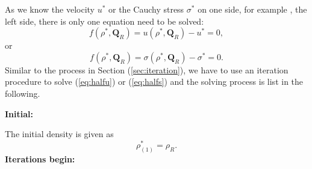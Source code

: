 \documentclass[review]{elsarticle}
\numberwithin{equation}{section}
\numberwithin{table}{section}
\begin{document}
As we know the velocity $u^*$ or the Cauchy stress $\sigma ^*$ on one side, for example , the left side, there is only one equation need to be solved:
\begin{equation}\label{eq:halfu}
  f(\rho^*,\mathbf{Q}_R) =u(\rho^*,\mathbf{Q}_R) - u^* = 0,
\end{equation}
or
\begin{equation}\label{eq:halfs}
  f(\rho^*,\mathbf{Q}_R) =\sigma(\rho^*,\mathbf{Q}_R) - \sigma^* = 0.
\end{equation}
Similar to the process in Section (\ref{sec:iteration}), we have to use an iteration procedure to solve (\ref{eq:halfu}) or (\ref{eq:halfs}) and
the solving process is list in the following.

\noindent  \textbf{Initial:}

	The initial density is  given as
\begin{equation}
\rho_{(1)}^* = \rho_R.
\end{equation}
\textbf{Iterations begin:}
\end{document}
